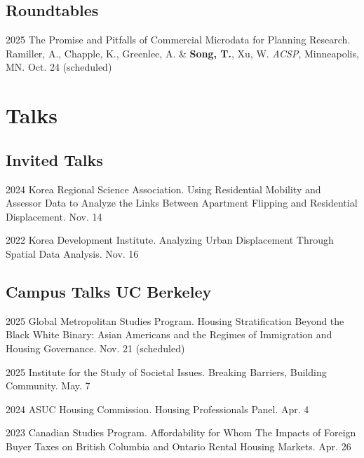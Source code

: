 \documentclass[11pt,letterpaper]{article}
\newcommand{\term}[1]{(#1)}
\begin{document}
\subsection{Roundtables}
\begin{tablist}
  \item[2025] \tab{}The Promise and Pitfalls of Commercial Microdata for Planning Research. Ramiller, A., Chapple, K., Greenlee, A. \& \textbf{Song, T.}, Xu, W. \emph{ACSP}, Minneapolis, MN. Oct. 24 \term{scheduled}
\end{tablist}

\section{Talks}

\subsection{Invited Talks}
\begin{tablist}
  \item[2024] \tab{}Korea Regional Science Association. Using Residential Mobility and Assessor Data to Analyze the Links Between Apartment Flipping and Residential Displacement. Nov. 14
  \item[2022] \tab{}Korea Development Institute. Analyzing Urban Displacement Through Spatial Data Analysis. Nov. 16
\end{tablist}

\subsection{Campus Talks UC Berkeley}
\begin{tablist}
  \item[2025] \tab{}Global Metropolitan Studies Program. Housing Stratification Beyond the Black White Binary: Asian Americans and the Regimes of Immigration and Housing Governance. Nov. 21 \term{scheduled}
  \item[2025] \tab{}Institute for the Study of Societal Issues. Breaking Barriers, Building Community. May. 7
  \item[2024] \tab{}ASUC Housing Commission. Housing Professionals Panel. Apr. 4
  \item[2023] \tab{}Canadian Studies Program. Affordability for Whom The Impacts of Foreign Buyer Taxes on British Columbia and Ontario Rental Housing Markets. Apr. 26
\end{tablist}
\end{document}
